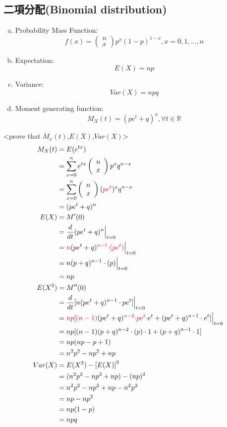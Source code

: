 \subsection{二項分配(Binomial distribution)}
\begin{enumerate}[a)]
\item Probability Mass Function:$$f(x)=\left(\begin{array}{c}n\\ x\end{array}\right)p^{x}(1-p)^{1-x},x=0,1,...,n$$
\item Expectation:$$E(X)=np$$
\item Variance:$$Var(X)=npq$$
\item Moment generating function:$$M_{X}(t)=(pe^{t}+q)^n,\forall t\in \mathbb{R}$$
\end{enumerate}
<prove that $M_{x}(t)$,$E(X)$,$Var(X)$>
\begin{align*}
M_{X}(t) &= E(e^{tx}) \\
         &= \sum_{\substack{x = 0 \\ }}^n e^{tx}\left(\begin{array}{c}n\\ x\end{array}\right)p^{x}q^{n-x} \\
         &=  \sum_{\substack{x = 0 \\ }}^n \left(\begin{array}{c}n\\ x\end{array}\right)(\textcolor{red}{pe^{t}})^{x}q^{n-x} \\
         &= (pe^{t}+q)^n \\
E(X)     &= M'(0)\\
         &= \frac{d}{dt}(pe^{t}+q)^n\Big|_{t=0}\\
         &= \textcolor{red}{n}(pe^{t}+q)^{\textcolor{red}{n-1}}\textcolor{red}{\cdot(pe^{t})}\Big|_{t=0}\\
         &= n(p+q)^{n-1}\cdot(p)\Big|_{t=0}\\
         &=np\\
E(X^2)   &=M''(0)\\
         &=\frac{d}{dt}[n(pe^{t}+q)^{n-1}\cdot pe^t]\Big|_{t=0}\\
         &=\textcolor{red}{np}[\textcolor{red}{(n-1)}(pe^{t}+q)^{\textcolor{red}{n-2}}{\textcolor{red}{\cdot pe^t \cdot}}e^t+(pe^{t}+q)^{n-1}\cdot e^t]\Big|_{t=0}\\
         &=np[(n-1)(p+q)^{n-2}\cdot(p)\cdot 1+(p+q)^{n-1}\cdot 1]\\
         &=np(np-p+1)\\
         &=n^2p^2-np^2+np\\
Var(X)   &=E(X^2)-\left[E(X)\right]^2\\
         &=(n^2p^2-np^2+np)-(np)^2\\
         &=n^2p^2-np^2+np-n^2p^2\\
         &=np-np^2\\
         &=np(1-p)\\
         &=npq
\end{align*}
